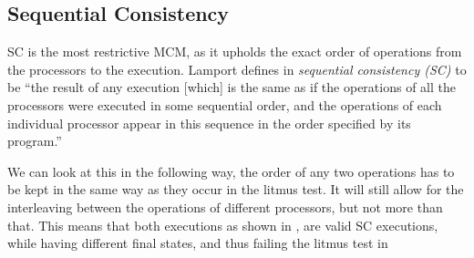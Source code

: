 \documentclass[runningheads]{llncs}
\begin{document}
\subsection{Sequential Consistency}
\label{sec:sc}
SC is the most restrictive MCM, as it upholds the exact order of operations from the processors to the execution.
Lamport defines in \cite{lamport1979make} \emph{sequential consistency (SC)} to be
``the result of any execution [which] is the same as if the operations of all
the processors were executed in some sequential order, and the
operations of each individual processor appear in this sequence in
the order specified by its program.''

We can look at this in the following way, the order of any two operations has to be kept in the same way as they occur in the litmus test.
It will still allow for the interleaving between the operations of different processors, but not more than that.
This means that both executions as shown in , are valid SC executions, while having different final states, and thus failing the litmus test in 
\end{document}
